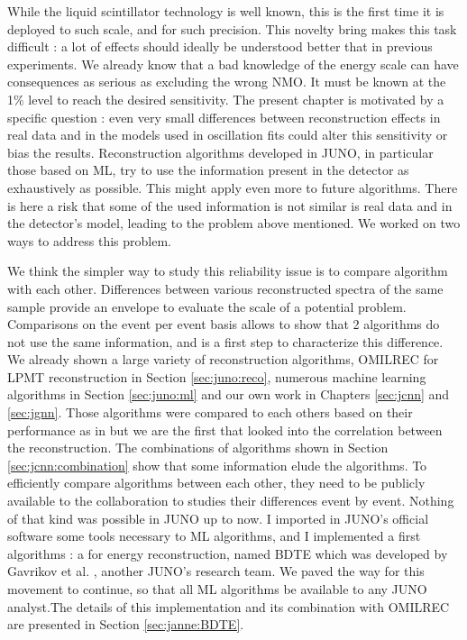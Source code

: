 \documentclass[../main.tex]{subfiles}
\begin{document}
While the liquid scintillator technology is well known, this is the first time it is deployed to such scale, and for such precision. This novelty bring makes this task difficult : a lot of effects should ideally be understood better that in previous experiments.
We already know that a bad knowledge of the energy scale can have consequences as serious as excluding the wrong NMO. It must be known at the 1\% level to reach the desired sensitivity. The present chapter is motivated by a specific question : even very small differences between reconstruction effects in real data and in the models used in oscillation fits could alter this sensitivity or bias the results. Reconstruction algorithms developed in JUNO, in particular those based on ML, try to use the information present in the detector as exhaustively as possible. This might apply even more to future algorithms. There is here a risk that some of the used information is not similar is real data and in the detector's model, leading to the problem above mentioned. We worked on two ways to address this problem.

We think the simpler way to study this reliability issue is to compare algorithm with each other. Differences between various reconstructed spectra of the same sample provide an envelope to evaluate the scale of a potential problem. Comparisons on the event per event basis allows to show that 2 algorithms do not use the same information, and is a first step to characterize this difference.
We already shown a large variety of reconstruction algorithms, OMILREC for LPMT reconstruction in Section \ref{sec:juno:reco}, numerous machine learning algorithms in Section \ref{sec:juno:ml} and our own work in Chapters \ref{sec:jcnn} and \ref{sec:jgnn}. Those algorithms were compared to each others based on their performance as in \cite{qian_vertex_2021} but we are the first that looked into the correlation between the reconstruction. The combinations of algorithms shown in Section \ref{sec:jcnn:combination} show that some information elude the algorithms. To efficiently compare algorithms between each other, they need to be publicly available to the collaboration to studies their differences event by event.
Nothing of that kind was possible in JUNO up to now. I imported in JUNO's official software some tools necessary to ML algorithms, and I implemented a first algorithms :  a for energy reconstruction, named BDTE which was developed by Gavrikov et al. \cite{gavrikov_energy_2022}, another JUNO's research team. We paved the way for this movement to continue, so that all ML algorithms be available to any JUNO analyst.The details of this implementation and its combination with OMILREC are presented in Section \ref{sec:janne:BDTE}.
\end{document}
